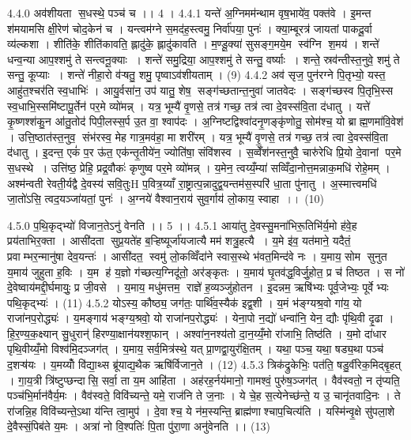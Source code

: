 4.4.0
अव॑शीयता स॒धस्थे॒ पञ्च॑ च ।। 4 ।
4.4.1
यन्ते॑ अ॒ग्निमम॑न्थाम वृष॒भाये॑व॒ पक्त॑वे । इ॒मन्त श॑मयामसि क्षी॒रेण॑ चोद॒केन॑ च । यन्त्वम॑ग्ने स॒मद॑ह॒स्त्वमु॒ निर्वा॑पया॒ पुनः॑ । क्या॒म्बूरत्र॑ जायतां पाकदू॒र्वा व्य॑ल्कशा । शीति॑के॒ शीति॑कावति॒ ह्लादु॑के॒ ह्लादु॑कावति । म॒ण्डू॒क्या॑ सुसङ्ग॒मये॒म स्व॑ग्नि श॒मय॑ । शन्ते॑ धन्व॒न्या आप॒श्शमु॑ ते सन्त्वनू॒क्याः । शन्ते॑ समु॒द्रिया॒ आप॒श्शमु॑ ते सन्तु॒ वर्ष्याः । शन्ते॒ स्रव॑न्तीस्त॒नुवे॒ शमु॑ ते सन्तु॒ कूप्याः । शन्ते॑ नीहा॒रो व॑ऱ्षतु॒ शमु॒ पृष्वाऽव॑शीयताम् । (9)
4.4.2
अव॑ सृज॒ पुन॑रग्ने पि॒तृभ्यो॒ यस्त॒ आहु॑त॒श्चर॑ति स्व॒धाभिः॑ । आयु॒र्वसा॑न॒ उप॑ यातु॒ शेष॒ सङ्ग॑च्छतान्त॒नुवा॑ जातवेदः । सङ्ग॑च्छस्व पि॒तृभि॒स्स स्व॒धाभि॒स्समि॑ष्टापू॒र्तेन॑ पर॒मे व्यो॑मन्न् । यत्र॒ भूम्यै॑ वृ॒णसे॒ तत्र॑ गच्छ॒ तत्र॑ त्वा दे॒वस्स॑वि॒ता द॑धातु । यत्ते॑ कृ॒ष्णश्श॑कु॒न आ॑तु॒तोद॑ पिपी॒लस्स॒र्प उ॒त वा॒ श्वाप॑दः । अ॒ग्निष्टद्विश्वा॑दनृ॒णङ्कृ॑णोतु॒ सोम॑श्च॒ यो ब्राह्म॒णमा॑वि॒वेश॑ । उत्ति॒ष्ठात॑स्त॒नुव॒ संभ॑रस्व॒ मेह गात्र॒मव॑हा॒ मा शरी॑रम् । यत्र॒ भूम्यै॑ वृ॒णसे॒ तत्र॑ गच्छ॒ तत्र॑ त्वा दे॒वस्स॑वि॒ता द॑धातु । इ॒दन्त॒ एकं॑ प॒र ऊ॑त॒ एक॑न्तृ॒तीये॑न॒ ज्योति॑षा॒ संवि॑शस्व । स॒व्वेँश॑नस्त॒नुवै॒ चारु॑रेधि प्रि॒यो दे॒वानां पर॒मे स॒धस्थे । उत्ति॑ष्ठ॒ प्रेहि॒ प्रद्र॒वौकः॑ कृणुष्व पर॒मे व्यो॑मन्न् । य॒मेन॒ त्वय्यँ॒म्या॑ सव्विँदा॒नोत्त॒मन्नाक॒मधि॑ रोहे॒मम् । अश्म॑न्वती रेवती॒र्यद्वै दे॒वस्य॑ सवि॒तुःH प॒वित्र॒य्याँ रा॒ष्ट्रात्प॒न्नादुद्व॒यन्तम॑स॒स्परि॑ धा॒ता पु॑नातु । अ॒स्मात्त्वमधि॑ जा॒तो॑ऽसि॒ त्वद॒यञ्जा॑यतां॒ पुनः॑ । अ॒ग्नये॑ वैश्वान॒राय॑ सुव॒र्गाय॑ लो॒काय॒ स्वाहा ।। (10)
\anuvakamend

4.5.0
प॒थि॒कृद्भ्यो॑ विजान॒तेऽनु॑ वेनति ।। 5 ।।
4.5.1
आया॑तु दे॒वस्सु॒मना॑भिरू॒तिभि॑र्य॒मो ह॑वे॒ह प्रय॑ताभिर॒क्ता । आसी॑दता सुप्र॒यते॑ह ब॒ऱ्हिष्यूर्जा॑यजात्यै मम॑ शत्रु॒हत्यै । य॒मे इ॑व॒ यत॑माने॒ यदैतं॒ प्रवाम्भर॒न्मानु॑षा देव॒यन्तः॑ । आसी॑दत॒ स्वमु॑ लो॒कव्विँदा॑ने स्वास॒स्थे भ॑वत॒मिन्द॑वे नः । य॒माय॒ सोम सुनुत य॒माय॑ जुहुता ह॒विः । य॒म ह॑ य॒ज्ञो ग॑च्छत्य॒ग्निदू॑तो॒ अर॑ङ्कृतः । य॒माय॑ घृ॒तव॑द्ध॒विर्जु॒होत॒ प्र च॑ तिष्ठत । स नो॑ दे॒वेष्वाय॑मद्दी॒र्घमायुः॒ प्र जी॒वसे । य॒माय॒ मधु॑मत्तम॒ राज्ञे॑ ह॒व्यञ्जु॑होतन । इ॒दन्नम॒ ऋषि॑भ्यः पूर्व॒जेभ्यः॒ पूर्वेभ्यः पथि॒कृद्भ्यः॑ । (11)
4.5.2
योऽस्य॒ कौष्ठ्य॒ जग॑तः॒ पार्थि॑व॒स्यैक॑ इद्व॒शी । य॒मं भ॑ङ्ग्यश्र॒वो गा॑य॒ यो राजा॑नप॒रोद्ध्यः॑ । य॒मङ्गाय॑ भङ्ग्य॒श्रवो॒ यो राजा॑नप॒रोद्ध्यः॑ । येना॒पो न॒द्यो॑ धन्वा॑नि॒ येन॒ द्यौः पृ॑थि॒वी दृ॒ढा । हि॒र॒ण्य॒क॒क्ष्यान् सु॒धुरान्॑ हिरण्या॒क्षान॑यश्श॒फान् । अश्वा॑न॒नश्य॑तो दा॒न॒य्यँ॒मो रा॑जाभि॒ तिष्ठ॑ति । य॒मो दा॑धार पृथि॒वीय्यँ॒मो विश्व॑मि॒दञ्जग॑त् । य॒माय॒ सर्व॒मित्र॑स्थे॒ यत् प्रा॒णद्वा॒युर॑क्षि॒तम् । यथा॒ पञ्च॒ यथा॒ षड्य॒था पञ्च॑ द॒शऱ्ष॑यः । य॒मय्योँ वि॑द्या॒थ्स ब्रू॑याद्य॒थैक ऋषि॑र्विजान॒ते । (12)
4.5.3
त्रिक॑द्रुकेभिः॒ पत॑ति॒ षडु॒र्वीरेक॒मिद्बृ॒हत् । गा॒य॒त्री त्रि॑ष्टुप्छन्दासि॒ सर्वा॒ ता य॒म आहि॑ता । अह॑रह॒र्नय॑मानो॒ गामश्वं॒ पुरु॑ष॒ञ्जग॑त् । वैव॑स्वतो॒ न तृ॑प्यति॒ पञ्च॑भि॒र्मान॑वैर्य॒मः । वैव॑स्वते॒ विवि॑च्यन्ते॒ यमे॒ राज॑नि ते ज॒नाः । ये चे॒ह स॒त्येनेच्छ॑न्ते॒ य उ॒ चानृ॑तवादि॒नः । ते रा॑जन्नि॒ह विवि॑च्यन्ते॒ऽथा य॑न्ति त्वा॒मुप॑ । दे॒वाश्च॒ ये न॑म॒स्यन्ति॒ ब्राह्म॑णाश्चाप॒चित्य॑ति । यस्मि॑न्वृ॒क्षे सु॑पला॒शे दे॒वैस्सं॒पिब॑ते य॒मः । अत्रा॑ नो वि॒श्पतिः॑ पि॒ता पु॑रा॒णा अनु॑वेनति ।। (13)
\anuvakamend

